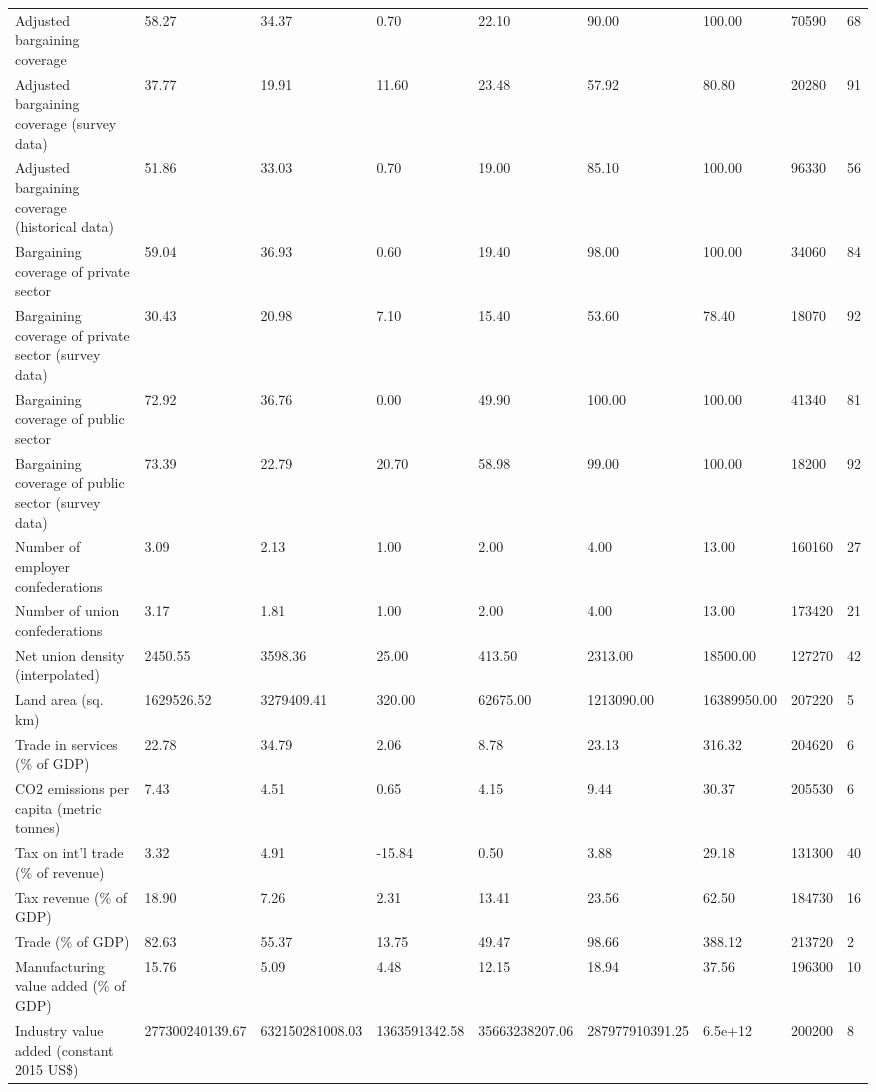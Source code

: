 \begin{longtable}{lllllllll}
Adjusted bargaining coverage & 58.27 & 34.37 & 0.70 & 22.10 & 90.00 & 100.00 & 70590 & 68\\
Adjusted bargaining coverage (survey data) & 37.77 & 19.91 & 11.60 & 23.48 & 57.92 & 80.80 & 20280 & 91\\
\addlinespace
Adjusted bargaining coverage (historical data) & 51.86 & 33.03 & 0.70 & 19.00 & 85.10 & 100.00 & 96330 & 56\\
Bargaining coverage of private sector & 59.04 & 36.93 & 0.60 & 19.40 & 98.00 & 100.00 & 34060 & 84\\
Bargaining coverage of private sector (survey data) & 30.43 & 20.98 & 7.10 & 15.40 & 53.60 & 78.40 & 18070 & 92\\
Bargaining coverage of public sector & 72.92 & 36.76 & 0.00 & 49.90 & 100.00 & 100.00 & 41340 & 81\\
Bargaining coverage of public sector (survey data) & 73.39 & 22.79 & 20.70 & 58.98 & 99.00 & 100.00 & 18200 & 92\\
\addlinespace
Number of employer confederations & 3.09 & 2.13 & 1.00 & 2.00 & 4.00 & 13.00 & 160160 & 27\\
Number of union confederations & 3.17 & 1.81 & 1.00 & 2.00 & 4.00 & 13.00 & 173420 & 21\\
Net union density (interpolated) & 2450.55 & 3598.36 & 25.00 & 413.50 & 2313.00 & 18500.00 & 127270 & 42\\
Land area (sq. km) & 1629526.52 & 3279409.41 & 320.00 & 62675.00 & 1213090.00 & 16389950.00 & 207220 & 5\\
Trade in services (\% of GDP) & 22.78 & 34.79 & 2.06 & 8.78 & 23.13 & 316.32 & 204620 & 6\\
\addlinespace
CO2 emissions per capita (metric tonnes) & 7.43 & 4.51 & 0.65 & 4.15 & 9.44 & 30.37 & 205530 & 6\\
Tax on int'l trade (\% of revenue) & 3.32 & 4.91 & -15.84 & 0.50 & 3.88 & 29.18 & 131300 & 40\\
Tax revenue (\% of GDP) & 18.90 & 7.26 & 2.31 & 13.41 & 23.56 & 62.50 & 184730 & 16\\
Trade (\% of GDP) & 82.63 & 55.37 & 13.75 & 49.47 & 98.66 & 388.12 & 213720 & 2\\
Manufacturing value added (\% of GDP) & 15.76 & 5.09 & 4.48 & 12.15 & 18.94 & 37.56 & 196300 & 10\\
\addlinespace
Industry value added (constant 2015 US\$) & 277300240139.67 & 632150281008.03 & 1363591342.58 & 35663238207.06 & 287977910391.25 & 6.5e+12 & 200200 & 8\\

\end{longtable}
